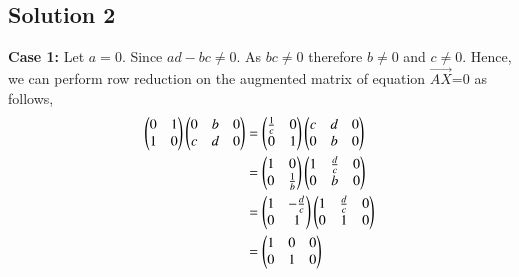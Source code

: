\documentclass[journal,12pt,twocolumn]{IEEEtran}
\begin{document}
\subsection{Solution 2}
\textbf{Case 1: }Let $a=0$. Since $ad-bc\not=0$. As $bc\not=0$ therefore $b\not=0$ and $c\not=0$. Hence, we can perform row reduction on the augmented matrix of equation $\vec{AX}$=0 as follows,
\begin{align}
\begin{pmatrix}0&1\\1&0\end{pmatrix}\begin{pmatrix}0&b&0\\c&d&0\end{pmatrix} &= \begin{pmatrix}\frac{1}{c}&0\\0&1\end{pmatrix}\begin{pmatrix}c&d&0\\0&b&0\end{pmatrix}\\
&=\begin{pmatrix}1&0\\0&\frac{1}{b}\end{pmatrix}\begin{pmatrix}1&\frac{d}{c}&0\\0&b&0\end{pmatrix}\\
&=\begin{pmatrix}1&-\frac{d}{c}\\0&1\end{pmatrix}\begin{pmatrix}1&\frac{d}{c}&0\\0&1&0\end{pmatrix}\\
&=\begin{pmatrix}1&0&0\\0&1&0\end{pmatrix}\label{eqI1}
\end{align}
\begin{comment}

\textbf{Case 2: }Let $a\not=0$. Hence, we can perform row reduction on the augmented matrix of equation $\vec{AX}$=0 as follows,
\begin{align}
\myvec{a&b&0\\c&d&0}&\xleftrightarrow{R_1 = \frac{1}{a}R_1}\myvec{1&\frac{b}{a}&0\\c&d&0}\\
&\xleftrightarrow{R_2 = R_2-cR_1}\myvec{1&\frac{b}{a}&0\\0&\frac{ad-bc}{a}&0}\\
&\xleftrightarrow{R_2=\frac{a}{ad-bc}R_2}\myvec{1&\frac{b}{a}&0\\0&1&0}\\
&\xleftrightarrow{R_1 = R_1-\frac{b}{a}R_2}\myvec{1&0&0\\0&1&0}\label{eqI2}
\end{align}
\textbf{Case 3: }Let $a,b,c,d \not= 0$. Hence, we can perform row reduction on the augmented matrix of equation $\vec{AX}$=0 as follows,
\begin{align}
\myvec{a&b&0\\c&d&0}&\xleftrightarrow{R_1 = \frac{1}{a}R_1}\myvec{1&\frac{b}{a}&0\\c&d&0}\\
&\xleftrightarrow{R_2 = R_2-cR_1}\myvec{1&\frac{b}{a}&0\\0&\frac{ad-bc}{a}&0}\\
&\xleftrightarrow{R_2=\frac{a}{ad-bc}R_2}\myvec{1&\frac{b}{a}&0\\0&1&0}\\
&\xleftrightarrow{R_1 = R_1-\frac{b}{a}R_2}\myvec{1&0&0\\0&1&0}\label{eqI3}
\end{align}

\end{comment}
\end{document}
